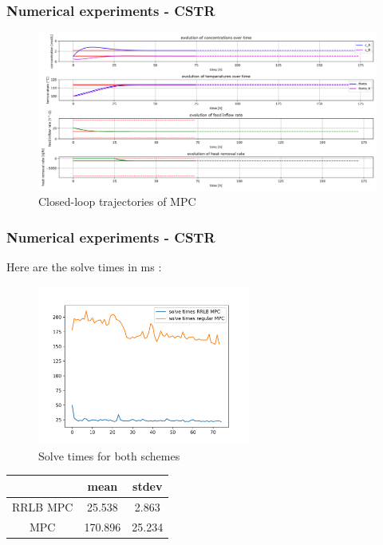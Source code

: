 \documentclass[10pt]{beamer}
\begin{document}
\begin{frame}
    \frametitle{Numerical experiments - CSTR}
    \begin{figure}[H]
        \centering
        \includegraphics[width=1.0\textwidth]{../cstr_package/mpc.png}
        \caption*{Closed-loop trajectories of MPC}
    \end{figure}
\end{frame}

\begin{frame}
    \frametitle{Numerical experiments - CSTR}
    Here are the solve times in ms :\newline
    \begin{minipage}{0.55\textwidth}
        \begin{figure}[H]
            \centering
            \includegraphics[width=7cm]{../cstr_package/solve_times.png}
            \caption*{Solve times for both schemes}
        \end{figure}
    \end{minipage}
    \begin{minipage}{0.40\textwidth}
        \begin{table}[H]
            \centering
            \begin{tabular}{|c|c|c|}
                \hline
                & mean & stdev\\
                \hline
                RRLB MPC & 25.538 & 2.863 \\
                \hline
                MPC & 170.896 & 25.234 \\
                \hline
              \end{tabular}
        \end{table}
    \end{minipage}
\end{frame}
\end{document}
